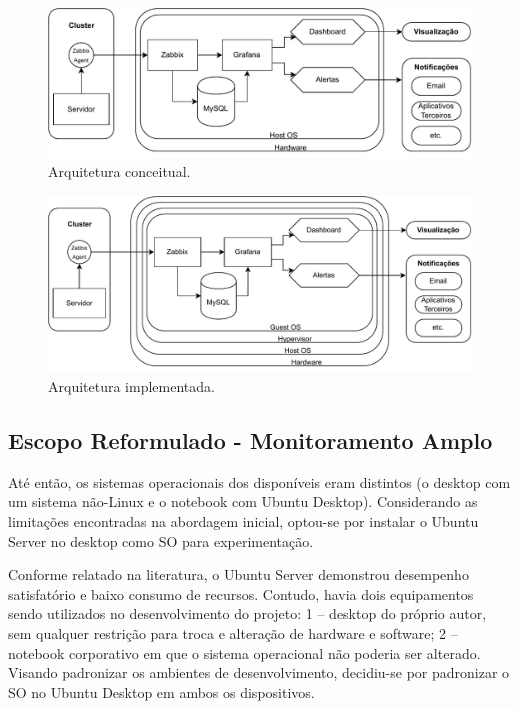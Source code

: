 \begin{figure}[H]
\centering
\setlength{\abovecaptionskip}{-20pt}
\includegraphics[width=\textwidth]{Imagens/chap03/v0_diagram.pdf}
\caption{Arquitetura conceitual.}
\label{fig:ArquiteturaConceitual}
\end{figure}

\begin{figure}[H]
\centering
\setlength{\abovecaptionskip}{-20pt}
\includegraphics[width=\textwidth]{Imagens/chap03/v1_diagram.pdf}
\caption{Arquitetura implementada.}
\label{fig:ArquiteturaImplementada}
\end{figure}

\subsection{Escopo Reformulado - Monitoramento Amplo}
\label{subsection:EscopoReformulado}

Até então, os sistemas operacionais dos  disponíveis eram distintos (o desktop com um sistema não-Linux e o notebook com Ubuntu Desktop). Considerando as limitações encontradas na abordagem inicial, optou-se por instalar o Ubuntu Server no desktop como SO para experimentação.

Conforme relatado na literatura, o Ubuntu Server demonstrou desempenho satisfatório e baixo consumo de recursos. Contudo, havia dois equipamentos sendo utilizados no desenvolvimento do projeto: 1 -- desktop do próprio autor, sem qualquer restrição para troca e alteração de hardware e software; 2 -- notebook corporativo em que o sistema operacional não poderia ser alterado. Visando padronizar os ambientes de desenvolvimento, decidiu-se por padronizar o SO no Ubuntu Desktop em ambos os dispositivos.

